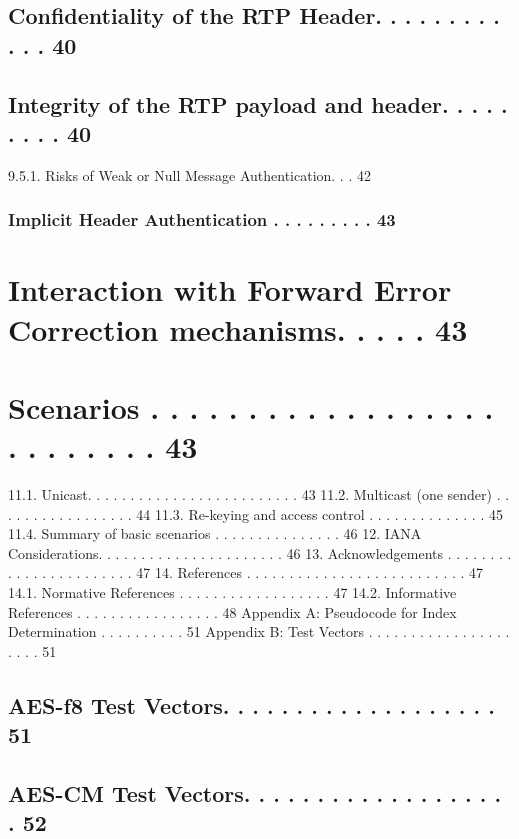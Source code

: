 \documentclass{article}
\begin{document}
\subsection{Confidentiality of the RTP Header. . . . . . . . . . . . 40}

\subsection{Integrity of the RTP payload and header. . . . . . . . . 40}

9.5.1. Risks of Weak or Null Message Authentication. . . 42

\subsubsection{Implicit Header Authentication . . . . . . . . . 43}

\section{Interaction with Forward Error Correction mechanisms. . . . . 43}

\section{Scenarios . . . . . . . . . . . . . . . . . . . . . . . . . . 43}

11.1. Unicast. . . . . . . . . . . . . . . . . . . . . . . . . 43 11.2. Multicast (one sender) . . . . . . . . . . . . . . . . . 44 11.3. Re-keying and access control . . . . . . . . . . . . . . 45 11.4. Summary of basic scenarios . . . . . . . . . . . . . . . 46 12. IANA Considerations. . . . . . . . . . . . . . . . . . . . . . 46 13. Acknowledgements . . . . . . . . . . . . . . . . . . . . . . . 47 14. References . . . . . . . . . . . . . . . . . . . . . . . . . . 47 14.1. Normative References . . . . . . . . . . . . . . . . . . 47 14.2. Informative References . . . . . . . . . . . . . . . . . 48 Appendix A: Pseudocode for Index Determination . . . . . . . . . . 51 Appendix B: Test Vectors . . . . . . . . . . . . . . . . . . . . . 51

\subsection{AES-f8 Test Vectors. . . . . . . . . . . . . . . . . . . 51}

\subsection{AES-CM Test Vectors. . . . . . . . . . . . . . . . . . . 52}
\end{document}
